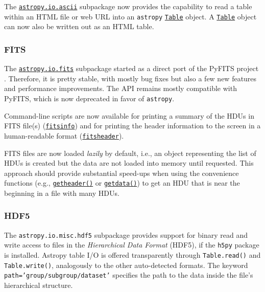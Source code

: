 \documentclass[modern]{aastex62}
\newcommand{\package}[1]{\texttt{#1}\xspace}
\newcommand{\astropypkg}{\package{astropy}}
\newcommand{\astropyiosubpkg}[1]{\href{http://docs.astropy.org/en/stable/io/#1/index.html}{\texttt{astropy.io.#1}}\xspace}
\newcommand{\astropyTable}{\href{http://docs.astropy.org/en/stable/api/astropy.table.Table.html}{\texttt{Table}}\xspace}
\begin{document}
The \astropyiosubpkg{ascii} subpackage now provides the capability
to read a table within an HTML file or web URL into an \astropypkg
\astropyTable object. A \astropyTable object can now also
be written out as an HTML table.

\subsubsection{FITS}

The \astropyiosubpkg{fits} subpackage started as a direct port of the
PyFITS project \citep{PyFITS}. Therefore, it is pretty stable, with mostly bug
fixes but also a few new features and performance improvements.  The API
remains mostly compatible with PyFITS, which is now deprecated in favor of
\astropypkg.

Command-line scripts are now available for printing a summary of the HDUs in
FITS file(s)
(\href{http://docs.astropy.org/en/stable/io/fits/usage/scripts.html#module-astropy.io.fits.scripts.fitsinfo}{\texttt{fitsinfo}})
and for printing the header information to the screen in a human-readable format
(\href{http://docs.astropy.org/en/stable/io/fits/usage/scripts.html#module-astropy.io.fits.scripts.fitsheader}{\texttt{fitsheader}}).

FITS files are now loaded \emph{lazily} by default, i.e., an object
representing the list of HDUs is created but the data are not loaded into
memory until requested.  This approach should provide substantial speed-ups
when using the convenience functions (e.g., \href{http://docs.astropy.org/en/stable/io/fits/api/files.html#getheader}{\texttt{getheader()}} or
\href{http://docs.astropy.org/en/stable/io/fits/api/files.html#getdata}{\texttt{getdata()}}) to get an HDU that is near the beginning in a file with
many HDUs.

\subsubsection{HDF5}

The \package{astropy.io.misc.hdf5} subpackage provides support for binary
read and write access to files in the \emph{Hierarchical Data Format}
(HDF5), if the \package{h5py} package is installed. Astropy table I/O
is offered transparently through \texttt{Table.read()} and
\texttt{Table.write()}, analogously to the other auto-detected
formats. The keyword \texttt{path='group/subgroup/dataset'} specifies
the path to the data inside the file's hierarchical structure.
\end{document}
